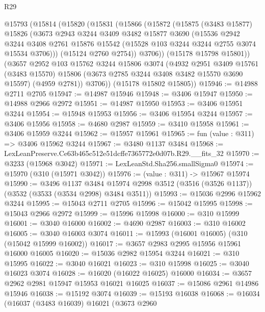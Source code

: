 \begin{lexlean}{R29}
\begin{coremodule}
  @15793
    (@15814
      (@15820
        (@15831
          (@15866
            (@15872
              (@15875
                (@3483 @15877)
                @15826
                (@3673
                  @2943
                  @3244
                  @3409
                  @3482
                  @15877
                  @3690
                  (@15536
                    @2942
                    @3244
                    @3408
                    @2761
                    @15876
                    @15542
                    (@15528 @103 @3244 @3244 @2755 @3074 @15534 @3706)))
                (@15124 @2760 @2754))
              @3706))
          (@15178 @15798 @15801))
        (@3657
          @2952
          @103
          @15762
          @3244
          @15806
          @3074
          (@4932
            @2951
            @3409
            @15761
            (@3483 @15570)
            @15806
            (@3673 @2785 @3244 @3408 @3482 @15570 @3690 @15597)
            (@4959 @2781))
          @3706))
      (@15178 @15802 @15805))
@15946 := @14988 @2711 @2705
@15947 := @14987 @15946
@15948 := @3406 @15947
@15950 := @14988 @2966 @2972
@15951 := @14987 @15950
@15953 := @3406 @15951 @3244
@15954 := @15948 @15953
@15956 := @3406 @15954 @3244
@15957 := @3406 @15956
@15958 := @4680 @2987
@15959 := @3410 @15958
@15961 := @3406 @15959 @3244
@15962 := @15957 @15961
@15965 := fun (value : @311) => @3406 @15962 @3244
@15967 := @3480 @1137 @3484
@15968 := LexLeanPreserve.Ce63b465c512e51dcffe7365772e0d07b.R29.__fits_32
@15970 := @3233 (@15968 @3042)
@15971 := LexLeanStd.Sha256.smallSigma0
@15974 := @15970 (@310 (@15971 @3042))
@15976 := (value : @311) -> @15967 @15974
@15990 := @3496
    @1137
    @3484
    @15974
    @2998
    @3512
    (@3516 (@3526 @1137))
    (@3532 (@3533 (@3534 @2998) @3484 @3511))
@15993 := @15036 @2996 @15962 @3244
@15995 := @15043 @2711 @2705
@15996 := @15042 @15995
@15998 := @15043 @2966 @2972
@15999 := @15996 @15998
@16000 := @310 @15999
@16001 := @3040 @16000
@16002 := @4690 @2987
@16003 := @310 @16002
@16005 := @3040 @16003 @3074
@16011 := @15993 (@16001 @16005) (@310 (@15042 @15999 @16002))
@16017 := @3657 @2983 @2995 @15956 @15961 @16000 @16005
@16020 := @15036 @2982 @15954 @3244
@16021 := @310 @15995
@16022 := @3040 @16021
@16023 := @310 @15998
@16025 := @3040 @16023 @3074
@16028 := @16020 (@16022 @16025) @16000
@16034 := @3657 @2962 @2981 @15947 @15953 @16021 @16025
@16037 := @15086 @2961 @14986 @15946
@16038 := @15192 @3074
@16039 := @15193 @16038
@16068 := @16034
    (@16037
      (@3483 @16039)
      @16021
      (@3673
        @2960

\end{coremodule}
\end{lexlean}
